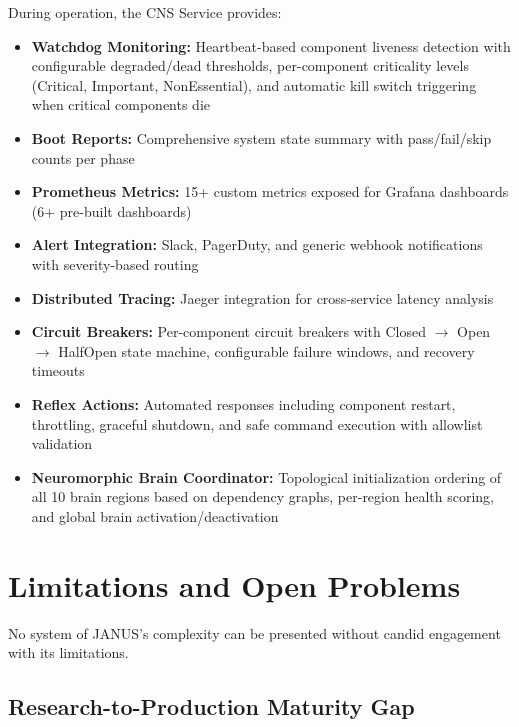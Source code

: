 \documentclass[12pt, a4paper]{article}
\begin{document}
During operation, the CNS Service provides:
\begin{itemize}
	\item \textbf{Watchdog Monitoring:} Heartbeat-based component liveness detection with configurable degraded/dead thresholds, per-component criticality levels (Critical, Important, NonEssential), and automatic kill switch triggering when critical components die
	\item \textbf{Boot Reports:} Comprehensive system state summary with pass/fail/skip counts per phase
	\item \textbf{Prometheus Metrics:} 15+ custom metrics exposed for Grafana dashboards (6+ pre-built dashboards)
	\item \textbf{Alert Integration:} Slack, PagerDuty, and generic webhook notifications with severity-based routing
	\item \textbf{Distributed Tracing:} Jaeger integration for cross-service latency analysis
	\item \textbf{Circuit Breakers:} Per-component circuit breakers with Closed $\to$ Open $\to$ HalfOpen state machine, configurable failure windows, and recovery timeouts
	\item \textbf{Reflex Actions:} Automated responses including component restart, throttling, graceful shutdown, and safe command execution with allowlist validation
	\item \textbf{Neuromorphic Brain Coordinator:} Topological initialization ordering of all 10 brain regions based on dependency graphs, per-region health scoring, and global brain activation/deactivation
\end{itemize}
\section{Limitations and Open Problems}
\label{sec:limitations}

No system of JANUS's complexity can be presented without candid engagement with its limitations.

\subsection{Research-to-Production Maturity Gap}
\label{sec:maturity_gap}
\end{document}

